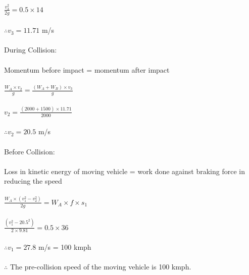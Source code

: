 $ \frac{v_3^2}{2g} = 0.5 \times 14 $\\\\
$ \therefore v_3 = 11.71 $ m/s \\\\
During Collision:\\\\
Momentum before impact = momentum after impact\\\\
$ \frac{W_A \times v_2}{g} = \frac{(W_A + W_B) \times v_3}{g}$\\\\
$ v_2 = \frac{(2000 + 1500) \times 11.71}{2000} $\\\\
$ \therefore v_2 = 20.5 $ m/s\\\\
Before Collision:\\\\
Loss in kinetic energy of moving vehicle = work done against braking force in reducing the speed\\\\
$ \frac{W_A \times (v_1^2 - v_2^2)}{2g} = W_A \times f \times s_1 $\\\\
$ \frac{(v_1^2 - 20.5^2)}{2 \times 9.81} = 0.5 \times 36 $\\\\
$ \therefore v_1 = 27.8 $ m/s = 100 kmph\\\\
$ \therefore $ The pre-collision speed of the moving vehicle is 100 kmph.
%
